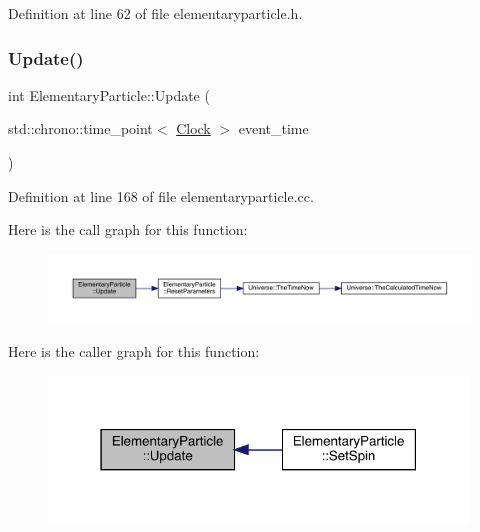 Definition at line 62 of file elementaryparticle.\+h.

\mbox{\label{class_elementary_particle_abf5114c3d032bc9511a14aa7368ec450}} 
\subsubsection{\texorpdfstring{Update()}{Update()}}
{\footnotesize\ttfamily int Elementary\+Particle\+::\+Update (\begin{DoxyParamCaption}\item[{std\+::chrono\+::time\+\_\+point$<$ \hyperlink{universe_8h_a0ef8d951d1ca5ab3cfaf7ab4c7a6fd80}{Clock} $>$}]{event\+\_\+time }\end{DoxyParamCaption})}



Definition at line 168 of file elementaryparticle.\+cc.

Here is the call graph for this function\+:
\nopagebreak
\begin{figure}[H]
\begin{center}
\leavevmode
\includegraphics[width=350pt]{class_elementary_particle_abf5114c3d032bc9511a14aa7368ec450_cgraph}
\end{center}
\end{figure}
Here is the caller graph for this function\+:
\nopagebreak
\begin{figure}[H]
\begin{center}
\leavevmode
\includegraphics[width=316pt]{class_elementary_particle_abf5114c3d032bc9511a14aa7368ec450_icgraph}
\end{center}
\end{figure}


